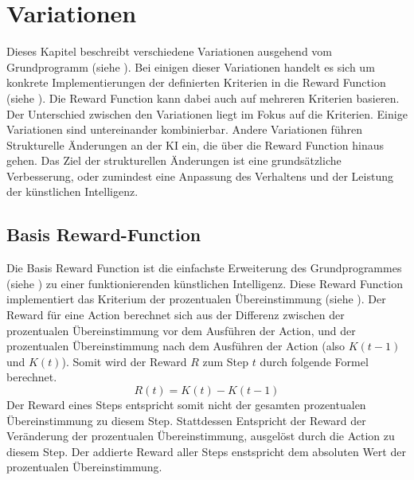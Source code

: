 \section{Variationen}\label{chap:m_var}
Dieses Kapitel beschreibt verschiedene Variationen ausgehend vom Grundprogramm
(siehe ). Bei einigen dieser Variationen handelt es sich
um konkrete Implementierungen der definierten Kriterien in die Reward Function
(siehe ). Die Reward Function kann dabei auch auf
mehreren Kriterien basieren. Der Unterschied zwischen den Variationen liegt im
Fokus auf die Kriterien. Einige Variationen sind untereinander kombinierbar.
Andere Variationen führen Strukturelle Änderungen an der KI ein, die über die
Reward Function hinaus gehen. Das Ziel der strukturellen Änderungen ist eine
grundsätzliche Verbesserung, oder zumindest eine Anpassung des Verhaltens und
der Leistung der künstlichen Intelligenz. 

\subsection{Basis Reward-Function}\label{sub:m_var_base}
Die Basis Reward Function ist die einfachste Erweiterung des Grundprogrammes
(siehe ) zu einer funktionierenden künstlichen
Intelligenz. Diese Reward Function implementiert das Kriterium der prozentualen
Übereinstimmung (siehe ). Der Reward für eine Action
berechnet sich aus der Differenz zwischen der prozentualen Übereinstimmung vor
dem Ausführen der Action, und der prozentualen Übereinstimmung nach dem
Ausführen der Action (also $K(t-1)$ und $K(t)$). Somit wird der Reward $R$ zum
Step $t$ durch folgende Formel berechnet. 
\[ R(t) = K(t) - K(t-1) \]
Der Reward eines Steps entspricht somit nicht der gesamten prozentualen
Übereinstimmung zu diesem Step. Stattdessen Entspricht der Reward der
Veränderung der prozentualen Übereinstimmung, ausgelöst durch die Action zu diesem
Step. Der addierte Reward aller Steps enstspricht dem absoluten Wert der
prozentualen Übereinstimmung.


